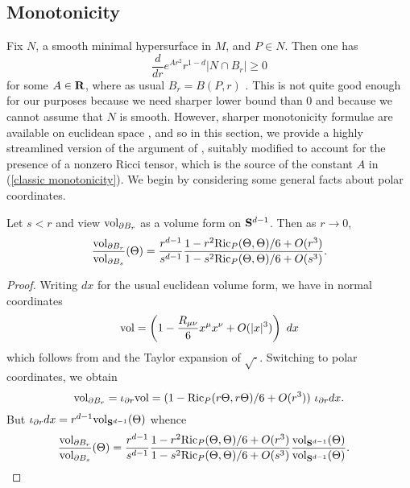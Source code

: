
\subsection{Monotonicity}\label{inequalities}
Fix $N$, a smooth minimal hypersurface in $M$, and $P \in N$. Then one has
\begin{equation}\label{classic monotonicity}
\frac{d}{dr} e^{Ar^2}r^{1 - d} |N \cap B_r| \geq 0
\end{equation}
for some $A \in \mathbf{R}$, where as usual $B_r = B(P, r)$ \cite[\S7]{MarquesXX}.
This is not quite good enough for our purposes because we need sharper lower bound than $0$ and because we cannot assume that $N$ is smooth.
However, sharper monotonicity formulae are available on euclidean space \cite[Proposition 5.12]{Giusti77}, and so in this section, we provide a highly streamlined version of the argument of \cite[Chapter 5]{Giusti77}, suitably modified to account for the presence of a nonzero Ricci tensor, which is the source of the constant $A$ in (\ref{classic monotonicity}).
We begin by considering some general facts about polar coordinates.

\begin{lemma}\label{rescale the sphere form}
Let $s < r$ and view $\mathrm{vol}_{\partial B_r}$ as a volume form on $\mathbf S^{d - 1}$.
Then as $r \to 0$,
$$\frac{\mathrm{vol}_{\partial B_r}}{\mathrm{vol}_{\partial B_s}}(\Theta) = \frac{r^{d - 1}}{s^{d - 1}} \frac{1 - r^2 \mathrm{Ric}_P(\Theta, \Theta)/6 + O(r^3)}{1 - s^2 \mathrm{Ric}_P(\Theta, \Theta)/6 + O(s^3)}.$$
\end{lemma}
\begin{proof}
Writing $dx$ for the usual euclidean volume form, we have in normal coordinates
$$\mathrm{vol} = \left(1 - \frac{R_{\mu\nu}}{6} x^\mu x^\nu + O(|x|^3)\right) ~dx$$
which follows from \cite[Lemma 3.4]{schoen1994lectures} and the Taylor expansion of $\sqrt \cdot$.
Switching to polar coordinates, we obtain
$$\mathrm{vol}_{\partial B_r} = \iota_{\partial r} \mathrm{vol} = (1 - \mathrm{Ric}_P(r\Theta, r\Theta)/6 + O(r^3)) ~\iota_{\partial r} dx.$$
But $\iota_{\partial r} dx = r^{d - 1} \mathrm{vol}_{\mathbf S^{d - 1}}(\Theta)$ whence
\begin{align*}
\frac{\mathrm{vol}_{\partial B_r}}{\mathrm{vol}_{\partial B_s}}(\Theta) &= \frac{r^{d - 1}}{s^{d - 1}} \frac{1 - r^2 \mathrm{Ric}_P(\Theta, \Theta)/6 + O(r^3)}{1 - s^2 \mathrm{Ric}_P(\Theta, \Theta)/6 +
O(s^3)} \frac{\mathrm{vol}_{\mathbf S^{d - 1}}(\Theta)}{\mathrm{vol}_{\mathbf S^{d - 1}}(\Theta)}. \qedhere
\end{align*}
\end{proof}

